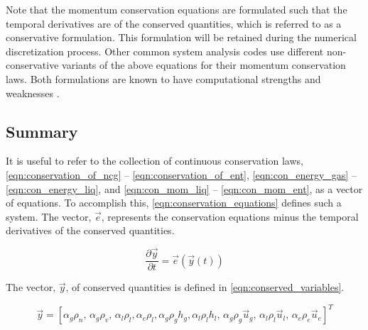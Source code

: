 Note that the momentum conservation equations are formulated such that the temporal derivatives are of the conserved quantities, which is referred to as a conservative formulation.
This formulation will be retained during the numerical discretization process.
Other common system analysis codes \cite{TRACE, RELAP} use different non-conservative variants of the above equations for their momentum conservation laws.
Both formulations are known to have computational strengths and weaknesses \cite{Park2009a}.

\subsection{Summary}
\label{subsect:summary}

It is useful to refer to the collection of continuous conservation laws, \eqref{eqn:conservation_of_ncg} -- \eqref{eqn:conservation_of_ent}, \eqref{eqn:con_energy_gas} -- \eqref{eqn:con_energy_liq}, and \eqref{eqn:con_mom_liq} -- \eqref{eqn:con_mom_ent}, as a vector of equations.
To accomplish this, \eqref{eqn:conservation_equations} defines such a system.
The vector, $\vec{e}$, represents the conservation equations minus the temporal derivatives of the conserved quantities.

\begin{equation}
\label{eqn:conservation_equations}
\frac{\partial \vec{y} }{\partial t} = \vec{e}(\vec{y}(t))
\end{equation}

The vector, $\vec{y}$, of conserved quantities is defined in \eqref{eqn:conserved_variables}.

\begin{equation}
\label{eqn:conserved_variables}
\vec{y} = [\alpha_g \rho_n,\, \alpha_g \rho_v,\, \alpha_l \rho_l, \alpha_e \rho_l, \alpha_g \rho_g h_g, \alpha_l \rho_l h_l,\, \alpha_g \rho_g \vec{u}_g,\, \alpha_l \rho_l \vec{u}_l,\, \alpha_e \rho_e \vec{u}_e]^{T}
\end{equation}

